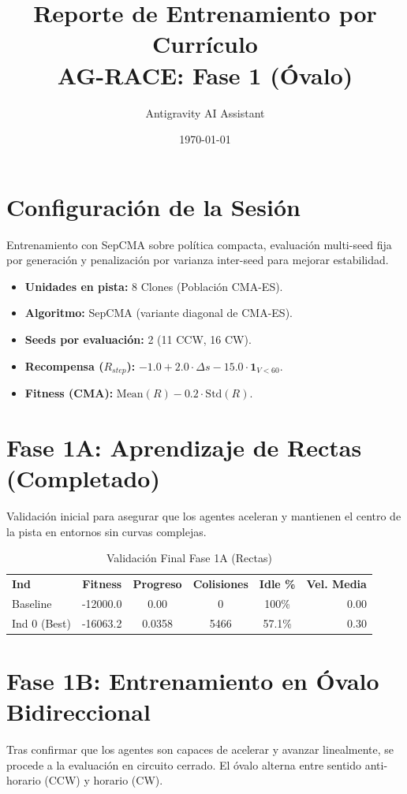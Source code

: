 \documentclass{article}
\title{\color{blue}Reporte de Entrenamiento por Currículo \\ \huge AG-RACE: Fase 1 (Óvalo)}
\author{Antigravity AI Assistant}
\date{\today}
\begin{document}
\maketitle

\section{Configuración de la Sesión}
Entrenamiento con SepCMA sobre política compacta, evaluación multi-seed fija por generación y
penalización por varianza inter-seed para mejorar estabilidad.

\begin{itemize}
    \item \textbf{Unidades en pista:} 8 Clones (Población CMA-ES).
    \item \textbf{Algoritmo:} SepCMA (variante diagonal de CMA-ES).
    \item \textbf{Seeds por evaluación:} 2 (11 CCW, 16 CW).
    \item \textbf{Recompensa ($R_{step}$):} $-1.0 + 2.0 \cdot \Delta s - 15.0 \cdot \mathbf{1}_{V < 60}$.
    \item \textbf{Fitness (CMA):} $\text{Mean}(R) - 0.2 \cdot \text{Std}(R)$.
\end{itemize}

\section{Fase 1A: Aprendizaje de Rectas (Completado)}
Validación inicial para asegurar que los agentes aceleran y mantienen el centro de la pista en entornos sin curvas complejas.

\begin{table}[h!]
\centering
\caption{Validación Final Fase 1A (Rectas)}
\begin{tabular}{@{}lccccr@{}}
\toprule
\textbf{Ind} & \textbf{Fitness} & \textbf{Progreso} & \textbf{Colisiones} & \textbf{Idle \%} & \textbf{Vel. Media} \\
Baseline & -12000.0 & 0.00 & 0 & 100\% & 0.00 \\
Ind 0 (Best) & -16063.2 & 0.0358 & 5466 & 57.1\% & 0.30 \\
\bottomrule
\end{tabular}
\end{table}

\section{Fase 1B: Entrenamiento en Óvalo Bidireccional}
Tras confirmar que los agentes son capaces de acelerar y avanzar linealmente, se procede a la evaluación en circuito cerrado. El óvalo alterna entre sentido anti-horario (CCW) y horario (CW).
\end{document}
